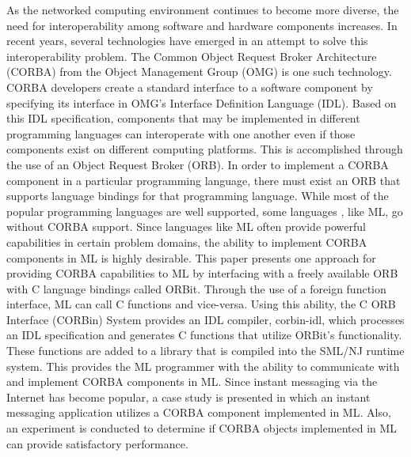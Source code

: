 
As the networked computing environment continues to become more diverse, 
the need for interoperability among software and hardware components increases.
In recent years, several technologies have emerged in an attempt to solve this 
interoperability problem.  The Common Object Request Broker Architecture (CORBA)
from the Object Management Group (OMG) is one such technology.  CORBA developers
create a standard interface to a software component by specifying its interface
in OMG's Interface Definition Language (IDL).   Based on this IDL specification,
components that may be implemented in different programming languages can 
interoperate with one another even if those components exist on different 
computing platforms. This is accomplished through the use of an Object Request 
Broker (ORB).  In order to implement a CORBA component in a particular programming
language, there must exist an ORB that supports language bindings for that 
programming language.   While most of the popular programming languages are well 
supported, some languages , like ML, go without CORBA support.   Since languages 
like ML often provide powerful capabilities in certain problem domains,  the 
ability to implement CORBA components in ML is highly desirable.  This paper 
presents one approach for providing CORBA capabilities to ML by interfacing with 
a freely available ORB with C language bindings called ORBit.  Through the use 
of a foreign function interface, ML can call C functions and vice-versa.  Using 
this ability, the C ORB Interface (CORBin) System provides an IDL compiler, corbin-idl,  
which processes an IDL specification and generates C functions that utilize 
ORBit's functionality.  These functions are added to a library that is compiled 
into the SML/NJ runtime system.  This provides the ML programmer with the ability to  
communicate with and implement CORBA components in ML. Since instant messaging 
via the Internet has become popular, a case study is presented in which an instant 
messaging application utilizes a CORBA component implemented in ML. Also, an
experiment is conducted to determine if CORBA objects implemented in ML 
can provide satisfactory performance.   

